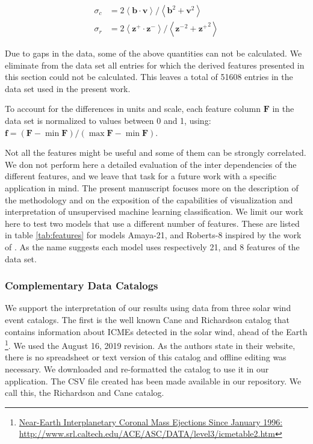 \begin{align}
\sigma_c & = 2 \left< \boldsymbol{b}\cdot\boldsymbol{v}\right>/\left<\boldsymbol{b}^2 + \boldsymbol{v}^2\right> \label{eq:sigmac} \\
\sigma_r & = 2 \left< \boldsymbol{z^+}\cdot\boldsymbol{z^-}\right>/\left<\boldsymbol{z^-}^2 + \boldsymbol{z^+}^2\right> \label{eq:sigmar}
\end{align}

Due to gaps in the data, some of the above quantities can not be calculated. We eliminate from the data set all entries for which the derived features presented in this section could not be calculated. This leaves a total of 51608 entries in the data set used in the present work.

To account for the differences in units and scale, each feature column $\boldsymbol{F}$ in the data set is normalized to values between 0 and 1, using: $\boldsymbol{f}=\left(\boldsymbol{F}-\min{\boldsymbol{F}}\right) /\left(\max{\boldsymbol{F}}-\min{\boldsymbol{F}}\right)$.

Not all the features might be useful and some of them can be strongly correlated. We don not perform here a detailed evaluation of the inter dependencies of the different features, and we leave that task for a future work with a specific application in mind. The present manuscript focuses more on the description of the methodology and on the exposition of the capabilities of visualization and interpretation of unsupervised machine learning classification. We limit our work here to test two models that use a different number of features. These are listed in table \ref{tab:features} for models Amaya-21, and Roberts-8 inspired by the work of \citep{Roberts2020}. As the name suggests each model uses respectively 21, and 8 features of the data set. 

\subsubsection{Complementary Data Catalogs}
We support the interpretation of our results using data from three solar wind event catalogs. The first is the well known Cane and Richardson catalog that contains information about ICMEs detected in the solar wind, ahead of the Earth \citep{Cane2003} \citep{Richardson2010} \footnote{\href{http://www.srl.caltech.edu/ACE/ASC/DATA/level3/icmetable2.htm}{Near-Earth Interplanetary Coronal Mass Ejections Since January 1996: http://www.srl.caltech.edu/ACE/ASC/DATA/level3/icmetable2.htm}}. We used the August 16, 2019 revision. As the authors state in their website, there is no spreadsheet or text version of this catalog and offline editing was necessary. We downloaded and re-formatted the catalog to use it in our application. The CSV file created has been made available in our repository. We call this, the Richardson and Cane catalog. 

